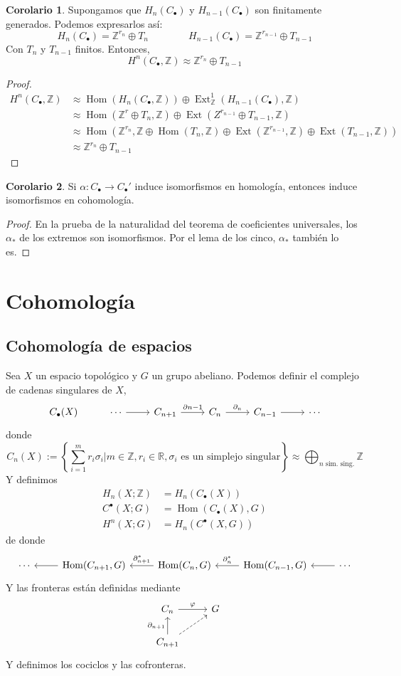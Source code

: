 \documentclass[spanish]{book}
\theoremstyle{definition}
\newtheorem*{coro}{Corolario}
\newcommand{\R}{\mathbb{R}}
\newcommand{\Z}{\mathbb{Z}}
\DeclareMathOperator{\Hom}{Hom}
\DeclareMathOperator{\Ext}{Ext}
\begin{document}
\begin{coro}
	Supongamos que $H_n(C_\bullet)$ y $H_{n-1}(C_\bullet)$ son finitamente generados. Podemos expresarlos así:
	\[H_n(C_\bullet)=\Z^{r_n}\oplus T_n\qquad\qquad H_{n-1}(C_\bullet)=\Z^{r_{n-1}}\oplus T_{n-1}\]
	Con $T_n$ y $T_{n-1}$ finitos. Entonces,
	\[H^n(C_\bullet,\Z)\approx\Z^{r_n}\oplus T_{n-1}\]
\end{coro}
\begin{proof}
	\begin{align*}
		H^n(C_\bullet,\Z)&\approx\Hom(H_n(C_\bullet,\Z))\oplus\Ext_\Z^1(H_{n-1}(C_\bullet),\Z)\\
		&\approx\Hom(\Z^r\oplus T_n,\Z)\oplus\Ext(Z^{r_{n-1}}\oplus T_{n-1},\Z)\\
		&\approx\Hom(\Z^{r_n},\Z\oplus\Hom(T_n,\Z)\oplus\Ext(\Z^{r_{n-1}},\Z)\oplus\Ext(T_{n-1},\Z))\\
		&\approx \Z^{r_n}\oplus T_{n-1}
	\end{align*}
\end{proof}
\begin{coro}
	Si $\alpha:C_\bullet\to C_\bullet'$ induce isomorfismos en homología, entonces induce isomorfismos en cohomología.
\end{coro}
\begin{proof}
	En la prueba de la naturalidad del teorema de coeficientes universales, los $\alpha_*$ de los extremos son isomorfismos. Por el lema de los cinco, $\alpha_*$ también lo es.
\end{proof}

\chapter{Cohomología}
\section{Cohomología de espacios}
Sea $X$ un espacio topológico y $G$ un grupo abeliano. Podemos definir el complejo de cadenas singulares de $X$,
\[\begin{tikzcd}
	C_\bullet(X)&\cdots\arrow[r]&C_{n+1}\arrow[r,"\partial{n-1}"]&C_n\arrow[r,"\partial_n"]&C_{n-1}\arrow[r]&\cdots
\end{tikzcd}\]
donde 
	\[C_n(X):=\left\{\sum_{i=1}^mr_i\sigma_i|m\in\Z,r_i\in\R,\sigma_i\text{ es un simplejo singular}\right\}\approx\bigoplus_{n\text{ sim. sing.}}\Z\]
Y definimos
\begin{align*}
	H_n(X;\Z)&=H_n(C_\bullet(X))\\
	C^\bullet(X;G)&=\Hom(C_\bullet(X),G)\\
	H^n(X;G)&=H_n(C^\bullet(X,G))
\end{align*}
de donde
\[\begin{tikzcd}
	\cdots&\Hom(C_{n+1},G)\arrow[l]&\Hom(C_n,G)\arrow[l,swap,"\partial_{n+1}^*"]&\Hom(C_{n-1},G)\arrow[l,swap,"\partial_n^*"]&\cdots\arrow[l]
\end{tikzcd}\]
Y las fronteras están definidas mediante
\[\begin{tikzcd}
	C_n\arrow[r,"\varphi"]&G\\
	C_{n+1}\arrow[u,"\partial_{n+1}"]\arrow[ur,dashed]
\end{tikzcd}\]
Y definimos los cociclos y las cofronteras.
\end{document}
